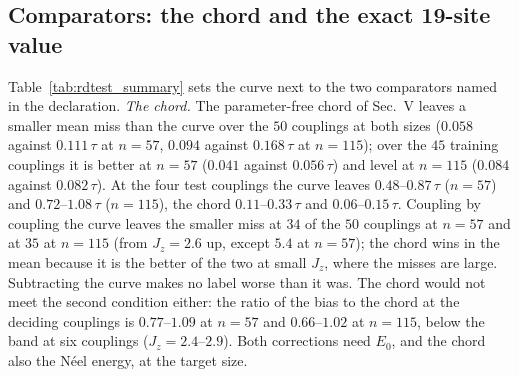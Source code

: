\documentclass[aps,prx,onecolumn,10pt,nofootinbib,longbibliography,floatfix]{revtex4-2}
\theoremstyle{remark}
\newcommand{\Jz}{J_z}
\begin{document}
\subsection{Comparators: the chord and the exact 19-site value}
Table~\ref{tab:rdtest_summary} sets the curve next to the two comparators named in the declaration. \emph{The chord.}
The parameter-free chord of Sec.~V leaves a smaller mean miss than the curve over the $50$ couplings at both sizes %
($0.058$ against $0.111\,\tau$ at $n=57$, $0.094$ against $0.168\,\tau$ at $n=115$); over the $45$ training %
couplings it is better at $n=57$ ($0.041$ against $0.056\,\tau$) and level at $n=115$ ($0.084$ against %
$0.082\,\tau$). At the four test couplings the curve leaves $0.48$--$0.87\,\tau$ ($n=57$) and $0.72$--$1.08\,\tau$ %
($n=115$), the chord $0.11$--$0.33\,\tau$ and $0.06$--$0.15\,\tau$. Coupling by coupling the curve leaves the %
smaller miss at $34$ of the $50$ couplings at $n=57$ and at $35$ at $n=115$ (from $\Jz=2.6$ up, except $5.4$ at $n=57$); the chord wins in %
the mean because it is the better of the two at small $\Jz$, where the misses are large. Subtracting the curve makes
no label worse than it was. The chord would not meet the second condition either: the ratio of the bias to the chord
at the deciding couplings is $0.77$--$1.09$ at $n=57$ and $0.66$--$1.02$ at $n=115$, below the band at six %
couplings ($\Jz=2.4$--$2.9$). Both corrections need $E_0$, and the chord also the N\'eel energy, at the target size.
\end{document}
